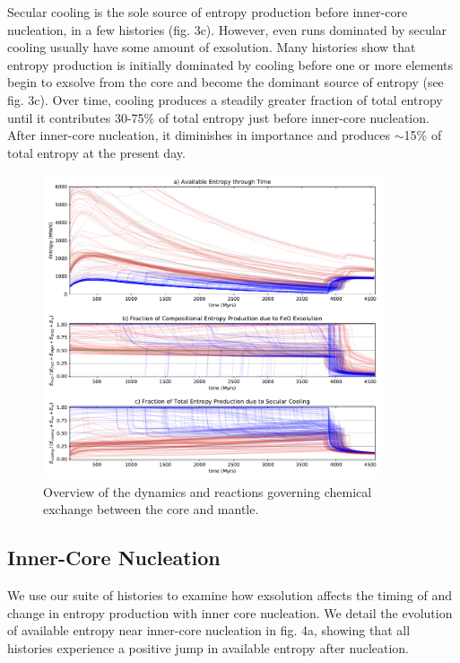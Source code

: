 \documentclass[]{article}
\begin{document}
	Secular cooling is the sole source of entropy production before inner-core nucleation, in a few histories (fig. 3c). However, even runs dominated by secular cooling usually have some amount of exsolution. Many histories show that entropy production is initially dominated by cooling before one or more elements begin to exsolve from the core and become the dominant source of entropy (see fig. 3c). Over time, cooling produces a steadily greater fraction of total entropy until it contributes 30-75\% of total entropy just before inner-core nucleation. After inner-core nucleation, it diminishes in importance and produces $\sim$15\% of total entropy at the present day.
	\begin{figure}\centering
		\includegraphics[width=10cm]{./figures/figure3.pdf}
		\caption{Overview of the dynamics and reactions governing chemical exchange between the core and mantle.}
		\label{fig3}
	\end{figure}
	
	\subsection{Inner-Core Nucleation}\label{inner-core-nucleation}
	We use our suite of histories to examine how exsolution affects the timing of and change in entropy production with inner core nucleation. We detail the evolution of available entropy near inner-core nucleation in fig. 4a, showing that all histories experience a positive jump in available entropy after nucleation. 
\end{document}
